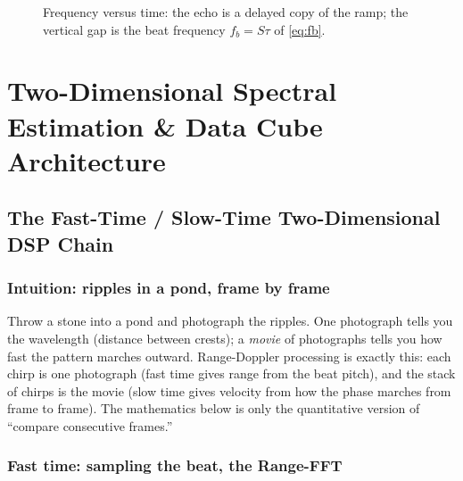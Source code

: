\documentclass[11pt,oneside]{book}
\begin{document}
\begin{figure}[htbp]
\centering
{}
\caption{Frequency versus time: the echo is a delayed copy of the ramp; the
vertical gap is the beat frequency $f_b=S\tau$ of \cref{eq:fb}.}
\label{fig:chirp}
\end{figure}

\part{Two-Dimensional Spectral Estimation \& Data Cube Architecture}

\chapter{The Fast-Time / Slow-Time Two-Dimensional DSP Chain}
\label{ch:dsp-chain}

\section{Intuition: ripples in a pond, frame by frame}
\label{sec:pond}

Throw a stone into a pond and photograph the ripples. One photograph tells
you the wavelength (distance between crests); a \emph{movie} of photographs
tells you how fast the pattern marches outward. Range-Doppler processing is
exactly this: each chirp is one photograph (fast time gives range from the
beat pitch), and the stack of chirps is the movie (slow time gives velocity
from how the phase marches from frame to frame). The mathematics below is
only the quantitative version of ``compare consecutive frames.''

\section{Fast time: sampling the beat, the Range-FFT}
\label{sec:range-fft}
\end{document}
